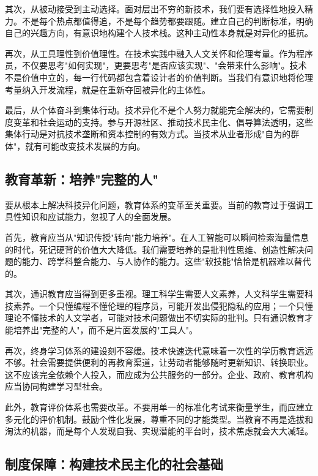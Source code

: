 \documentclass[a4paper,12pt]{ctexart}
\begin{document}
其次，从被动接受到主动选择。面对层出不穷的新技术，我们要有选择性地投入精力。不是每个热点都值得追，不是每个趋势都要跟随。建立自己的判断标准，明确自己的兴趣方向，有意识地构建个人技术栈。这种主动性本身就是对异化的抵抗。

再次，从工具理性到价值理性。在技术实践中融入人文关怀和伦理考量。作为程序员，不仅要思考"如何实现"，更要思考"是否应该实现"、"会带来什么影响"。技术不是价值中立的，每一行代码都包含着设计者的价值判断。当我们有意识地将伦理考量纳入开发流程，就是在重新夺回被异化的主体性。

最后，从个体奋斗到集体行动。技术异化不是个人努力就能完全解决的，它需要制度变革和社会运动的支持。参与开源社区、推动技术民主化、倡导算法透明，这些集体行动是对抗技术垄断和资本控制的有效方式。当技术从业者形成"自为的群体"，就有可能改变技术发展的方向。

\subsection{教育革新：培养"完整的人"}

要从根本上解决科技异化问题，教育体系的变革至关重要。当前的教育过于强调工具性知识和应试能力，忽视了人的全面发展。

首先，教育应当从"知识传授"转向"能力培养"。在人工智能可以瞬间检索海量信息的时代，死记硬背的价值大大降低。我们需要培养的是批判性思维、创造性解决问题的能力、跨学科整合能力、与人协作的能力。这些"软技能"恰恰是机器难以替代的。

其次，通识教育应当得到更多重视。理工科学生需要人文素养，人文科学生需要科技素养。一个只懂编程不懂伦理的程序员，可能开发出侵犯隐私的应用；一个只懂理论不懂技术的人文学者，可能对技术问题做出不切实际的批判。只有通识教育才能培养出"完整的人"，而不是片面发展的"工具人"。

再次，终身学习体系的建设刻不容缓。技术快速迭代意味着一次性的学历教育远远不够。社会需要提供便利的再教育渠道，让劳动者能够随时更新知识、转换职业。这不应该完全依赖个人投入，而应成为公共服务的一部分。企业、政府、教育机构应当协同构建学习型社会。

此外，教育评价体系也需要改革。不要用单一的标准化考试来衡量学生，而应建立多元化的评价机制。鼓励个性化发展，尊重不同的才能类型。当教育不再是选拔和淘汰的机器，而是每个人发现自我、实现潜能的平台时，技术焦虑就会大大减轻。

\subsection{制度保障：构建技术民主化的社会基础}
\end{document}

